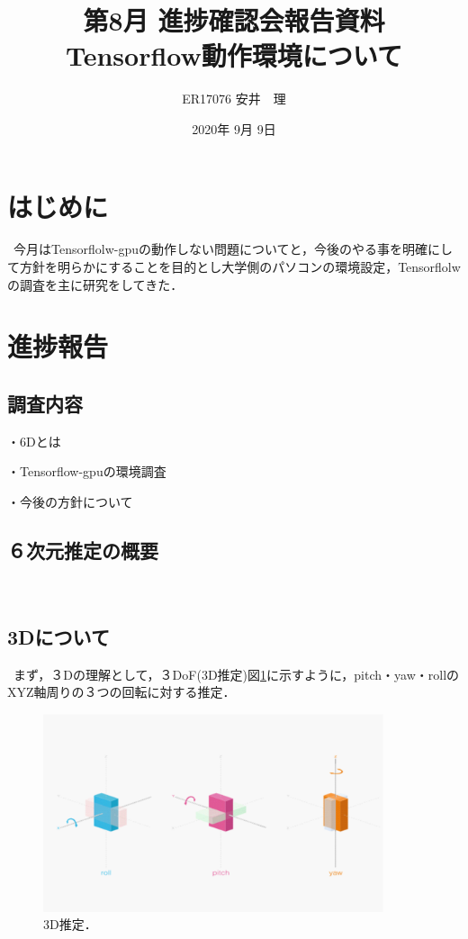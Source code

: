 \documentclass[11pt,a4j,ascmac]{jarticle}
\title{第8月 進捗確認会報告資料\\
Tensorflow動作環境について}
\author{ER17076  安井　理}
\date{2020年 9月 9日}
\begin{document}
\maketitle


\section{はじめに}

\  今月はTensorflolw-gpuの動作しない問題についてと，今後のやる事を明確にして方針を明らかにすることを目的とし大学側のパソコンの環境設定，Tensorflolwの調査を主に研究をしてきた．



\section{進捗報告}



\subsection{調査内容}

\begin{description}
  \item ・6Dとは
　\item ・Tensorflow-gpuの環境調査
　\item ・今後の方針について
\end{description}



\subsection{６次元推定の概要}
\  

\subsection{3Dについて}

\  まず，３Dの理解として，３DoF(3D推定)図\ref{fig:3D}に示すように，pitch・yaw・rollのXYZ軸周りの３つの回転に対する推定．
\\ 

      \begin{figure}[htpp]
      \centering
      \includegraphics[width=100mm]{3D.eps}
      \vspace*{20mm}
      \caption{3D推定．}
      \label{fig:3D}
      \end{figure}
\end{document}
